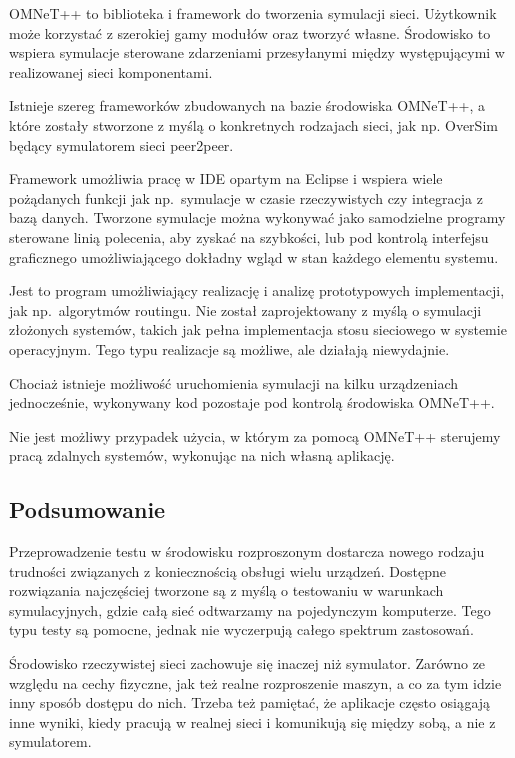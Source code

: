 \documentclass[00-praca-magisterska.tex]{subfiles}
\begin{document}
OMNeT++ to biblioteka i framework do tworzenia symulacji sieci. Użytkownik może korzystać z
szerokiej gamy modułów oraz tworzyć własne. Środowisko to wspiera symulacje
sterowane zdarzeniami przesyłanymi między występującymi w realizowanej sieci
komponentami.

Istnieje szereg frameworków zbudowanych na bazie środowiska OMNeT++, a które
zostały stworzone z myślą o konkretnych rodzajach sieci, jak np. OverSim będący
symulatorem sieci peer2peer.

Framework umożliwia pracę w IDE opartym na Eclipse i wspiera wiele pożądanych
funkcji jak np.~symulacje w czasie rzeczywistych czy integracja z bazą danych.
Tworzone symulacje można wykonywać jako samodzielne programy sterowane linią
polecenia, aby zyskać na szybkości, lub pod kontrolą interfejsu graficznego
umożliwiającego dokładny wgląd w stan każdego elementu systemu.

Jest to program umożliwiający realizację i analizę prototypowych implementacji,
jak np.~algorytmów routingu. Nie został zaprojektowany z myślą o symulacji
złożonych systemów, takich jak pełna implementacja stosu sieciowego w systemie
operacyjnym. Tego typu realizacje są możliwe, ale działają niewydajnie.

Chociaż istnieje możliwość uruchomienia symulacji na kilku urządzeniach
jednocześnie, wykonywany kod pozostaje pod kontrolą środowiska OMNeT++.

Nie jest możliwy przypadek użycia, w którym za pomocą OMNeT++ sterujemy pracą
zdalnych systemów, wykonując na nich własną aplikację.

\subsection{Podsumowanie}

Przeprowadzenie testu w środowisku rozproszonym dostarcza nowego rodzaju
trudności związanych z koniecznością obsługi wielu urządzeń. Dostępne
rozwiązania najczęściej tworzone są z myślą o testowaniu w warunkach
symulacyjnych, gdzie całą sieć odtwarzamy na pojedynczym komputerze. Tego typu
testy są pomocne, jednak nie wyczerpują całego spektrum zastosowań.

Środowisko rzeczywistej sieci zachowuje się inaczej niż symulator. Zarówno ze
względu na cechy fizyczne, jak też realne rozproszenie maszyn, a co za tym
idzie inny sposób dostępu do nich. Trzeba też pamiętać, że aplikacje często
osiągają inne wyniki, kiedy pracują w realnej sieci i komunikują się między
sobą, a nie z symulatorem.
\end{document}

